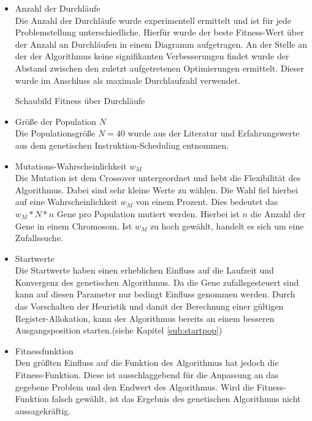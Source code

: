 \begin{itemize}
	\item Anzahl der Durchläufe\\
		Die Anzahl der Durchläufe wurde experimentell ermittelt und ist für jede Problemstellung unterschiedliche. Hierfür wurde der beste Fitness-Wert über der Anzahl an Durchläufen in einem Diagramm aufgetragen. An der Stelle an der der Algorithmus keine signifikanten Verbesserungen findet wurde der Abstand zwischen den zuletzt aufgetretenen Optimierungen ermittelt. Dieser wurde im Anschluss als maximale Durchlaufzahl verwendet.
		
		Schaubild Fitness über Durchläufe 
	\item Größe der Population $N$\\
		Die Populationsgröße $N = 40$ wurde aus der Literatur \cite{grefenstette1986optimization} und Erfahrungswerte aus dem genetischen Instruktion-Scheduling entnommen.  
	
	\item Mutations-Wahrscheinlichkeit $w_M$\\
		Die Mutation ist dem Crossover untergeordnet und hebt die Flexibilität des Algorithmus. Dabei sind sehr kleine Werte zu wählen. Die Wahl fiel hierbei auf eine Wahrscheinlichkeit $w_M$ von einem Prozent. Dies bedeutet das $w_M * N * n$ Gene pro Population mutiert werden. Hierbei ist $n$ die Anzahl der Gene in einem Chromosom. Ist $w_M$ zu hoch gewählt, handelt es sich um eine Zufallssuche.
		
	\item Startwerte\\
		Die Startwerte haben einen erheblichen Einfluss auf die Laufzeit und Konvergenz des genetischen Algorithmus. Da die Gene zufallsgesteuert sind kann auf diesen Parameter nur bedingt Einfluss genommen werden. Durch das Vorschalten der Heuristik und damit der Berechnung einer gültigen Register-Allokation, kann der Algorithmus bereits an einem besseren Ausgangsposition starten.(siehe Kapitel \ref{sub:startpop})
	\item Fitnessfunktion\\
		Den größten Einfluss auf die Funktion des Algorithmus hat jedoch die Fitness-Funktion. Diese ist ausschlaggebend für die Anpassung an das gegebene Problem und den Endwert des Algorithmus. Wird die Fitness-Funktion falsch gewählt, ist das Ergebnis des genetischen Algorithmus nicht aussagekräftig. 
\end{itemize}
 
